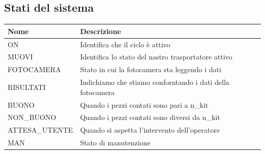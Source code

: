 \documentclass{article}
\begin{document}
\subsection{Stati del sistema}
\begin{center}
    \begin{tabular}{l l}
        \toprule
        \textbf{Nome}  & \textbf{Descrizione}                                       \\
        \midrule
        \midrule

        ON             & Identifica che il ciclo è attivo                           \\
        \midrule
        MUOVI          & Identifica lo stato del nastro trasportatore attivo        \\
        \midrule
        FOTOCAMERA     & Stato in cui la fotocamera sta leggendo i dati             \\
        \midrule
        RISULTATI      & Indichiamo che stiamo conforntando i dati della fotocamera \\
        \midrule
        BUONO          & Quando i pezzi contati sono pari a n\_kit                  \\
        \midrule
        NON\_BUONO     & Quando i pezzi contati sono diversi da n\_kit              \\
        \midrule
        ATTESA\_UTENTE & Quando si aspetta l'intervento dell'operatore              \\
        \midrule
        MAN            & Stato di manutenzione                                      \\

        \bottomrule
    \end{tabular}
\end{center}
\end{document}
